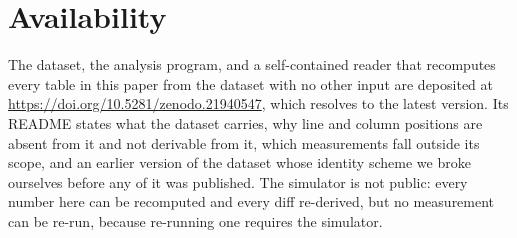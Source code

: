 \documentclass[12pt]{article}
\begin{document}
\section*{Availability}

The dataset, the analysis program, and a self-contained reader that recomputes
every table in this paper from the dataset with no other input are deposited at
\url{https://doi.org/10.5281/zenodo.21940547}, which resolves to the latest
version. Its README states what the dataset carries, why line and
column positions are absent from it and not derivable from it, which measurements
fall outside its scope, and an earlier version of the dataset whose identity
scheme we broke ourselves before any of it was published. The simulator is not public: every number here can be
recomputed and every diff re-derived, but no measurement can be re-run, because
re-running one requires the simulator.

{\footnotesize


}
\end{document}

